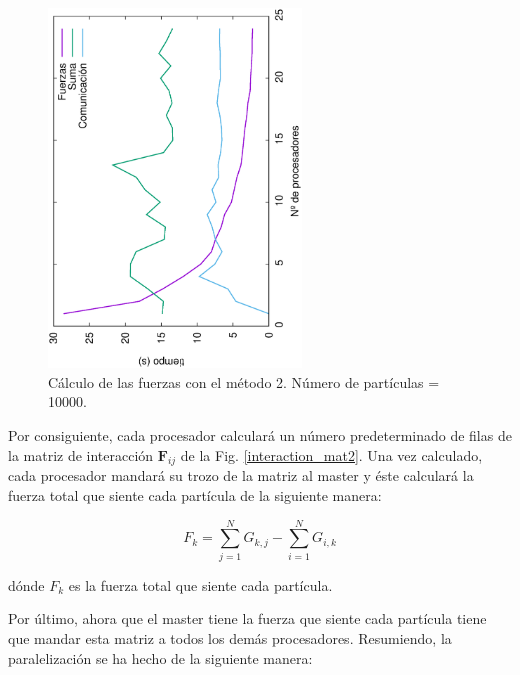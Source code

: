 \documentclass[onecolumn]{article}
\renewcommand{\vec}[1]{\mathbf{#1}}
\begin{document}
\begin{figure}[ht]
\begin{center}
\includegraphics[width=0.6\textwidth, angle=-90]{forces_proc1.eps}
\caption{Cálculo de las fuerzas con el método 2. Número de partículas = 10000.}
\label{xabi_1}
\end{center}
\end{figure}

Por consiguiente, cada procesador calculará un número predeterminado de filas de la matriz de interacción $\vec{F}_{ij}$ de la Fig. \ref{interaction_mat2}. Una vez calculado, cada procesador mandará su trozo de la matriz al master y éste calculará la fuerza total que siente cada partícula de la siguiente manera:

\begin{equation}
    F_k = \sum_{j=1}^N G_{k,j} - \sum_{i=1}^N G_{i,k}
\end{equation}
\label{sum}

dónde $F_k$ es la fuerza total que siente cada partícula.

Por último, ahora que el master tiene la fuerza que siente cada partícula tiene que mandar esta matriz a todos los demás procesadores. Resumiendo, la paralelización se ha hecho de la siguiente manera:
\end{document}
